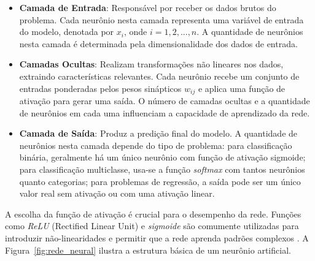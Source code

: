 \begin{itemize}
    \item \textbf{Camada de Entrada}: Responsável por receber os dados brutos do problema. Cada neurônio nesta camada representa uma variável de entrada do modelo, denotada por $x_i$, onde $i = 1, 2, ..., n$. A quantidade de neurônios nesta camada é determinada pela dimensionalidade dos dados de entrada.
    
    \item \textbf{Camadas Ocultas}: Realizam transformações não lineares nos dados, extraindo características relevantes. Cada neurônio recebe um conjunto de entradas ponderadas pelos pesos sinápticos $w_{ij}$ e aplica uma função de ativação para gerar uma saída. O número de camadas ocultas e a quantidade de neurônios em cada uma influenciam a capacidade de aprendizado da rede.
    
    \item \textbf{Camada de Saída}: Produz a predição final do modelo. A quantidade de neurônios nesta camada depende do tipo de problema: para classificação binária, geralmente há um único neurônio com função de ativação sigmoide; para classificação multiclasse, usa-se a função \textit{softmax} com tantos neurônios quanto categorias; para problemas de regressão, a saída pode ser um único valor real sem ativação ou com uma ativação linear.
\end{itemize}

A escolha da função de ativação é crucial para o desempenho da rede. Funções como \textit{ReLU} (Rectified Linear Unit) e \textit{sigmoide} são comumente utilizadas para introduzir não-linearidades e permitir que a rede aprenda padrões complexos \cite{goodfellow2016deep}. A Figura~\ref{fig:rede_neural} ilustra a estrutura básica de um neurônio artificial. 

